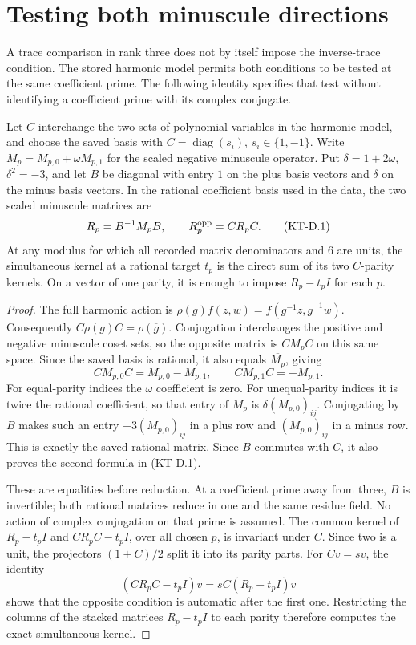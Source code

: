 \section{Testing both minuscule directions}
\label{sec:kt-dual-hecke}

A trace comparison in rank three does not by itself impose the
inverse-trace condition.  The stored harmonic model permits both
conditions to be tested at the same coefficient prime.  The following
identity specifies that test without identifying a coefficient prime
with its complex conjugate.

\begin{lemma}
Let $C$ interchange the two sets of polynomial variables in the
harmonic model, and choose the saved basis with
$C=\operatorname{diag}(s_i)$, $s_i\in\{1,-1\}$.
Write $M_p=M_{p,0}+\omega M_{p,1}$ for the scaled negative
minuscule operator.  Put $\delta=1+2\omega$, $\delta^2=-3$,
and let $B$ be diagonal with entry $1$ on the plus basis
vectors and $\delta$ on the minus basis vectors.  In the
rational coefficient basis used in the data, the two scaled
minuscule matrices are
\[
       R_p=B^{-1}M_pB,\qquad R_p^{\rm opp}=CR_pC.
                                                               \tag{KT-D.1}
\]
At any modulus for which all recorded matrix denominators and
$6$ are units, the simultaneous kernel at a rational target $t_p$
is the direct sum of its two $C$-parity kernels.  On a vector of
one parity, it is enough to impose $R_p-t_pI$ for each $p$.
\end{lemma}
\begin{proof}
The full harmonic action is
$\rho(g)f(z,w)=f(g^{-1}z,\overline g^{-1}w)$.
Consequently $C\rho(g)C=\rho(\overline g)$.
Conjugation interchanges the positive and negative minuscule
coset sets, so the opposite matrix is $CM_pC$ on this same
space.  Since the saved basis is rational, it also equals
$\overline{M_p}$, giving
\[
 CM_{p,0}C=M_{p,0}-M_{p,1},\qquad
 CM_{p,1}C=-M_{p,1}.
\]
For equal-parity indices the $\omega$ coefficient is zero.
For unequal-parity indices it is twice the rational coefficient,
so that entry of $M_p$ is $\delta(M_{p,0})_{ij}$.
Conjugating by $B$ makes such an entry
$-3(M_{p,0})_{ij}$ in a plus row and
$(M_{p,0})_{ij}$ in a minus row.  This is exactly the saved
rational matrix.  Since $B$ commutes with $C$, it also proves
the second formula in (KT-D.1).

These are equalities before reduction.  At a coefficient
prime away from three, $B$ is invertible; both rational
matrices reduce in one and the same residue field.  No action
of complex conjugation on that prime is assumed.
The common kernel of $R_p-t_pI$ and $CR_pC-t_pI$, over all
chosen $p$, is invariant under $C$.  Since two is a unit,
the projectors $(1\pm C)/2$ split it into its parity parts.
For $Cv=sv$, the identity
\[
        (CR_pC-t_pI)v=sC(R_p-t_pI)v
\]
shows that the opposite condition is automatic after the
first one.  Restricting the columns of the stacked matrices
$R_p-t_pI$ to each parity therefore computes the exact
simultaneous kernel.
\end{proof}

